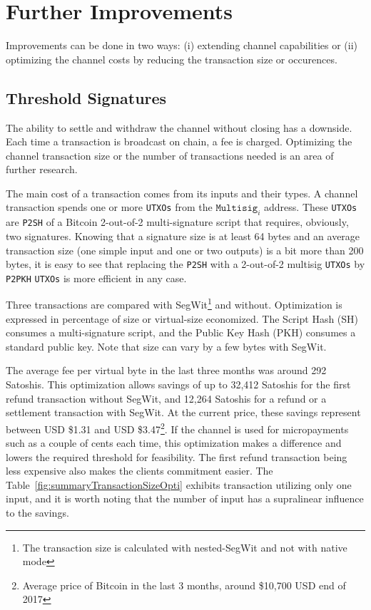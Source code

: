 \documentclass{llncs}
\begin{document}
\section{Further Improvements} Improvements can be done in two ways: (i)
extending channel capabilities or (ii) optimizing the channel costs by reducing
the transaction size or occurences.

\subsection{Threshold Signatures} The ability to settle and withdraw the channel
without closing has a downside. Each time a transaction is broadcast on chain, a
fee is charged. Optimizing the channel transaction size or the number of
transactions needed is an area of further research.

The main cost of a transaction comes from its inputs and their types. A channel
transaction spends one or more \texttt{UTXOs} from the $\texttt{Multisig}_{i}$
address. These \texttt{UTXOs} are \texttt{P2SH} of a Bitcoin 2-out-of-2
multi-signature script that requires, obviously, two signatures. Knowing that a
signature size is at least 64 bytes and an average transaction size (one simple
input and one or two outputs) is a bit more than 200 bytes, it is easy to see
that replacing the \texttt{P2SH} with a 2-out-of-2 multisig \texttt{UTXOs} by
\texttt{P2PKH} \texttt{UTXOs} is more efficient in any case.

Three transactions are compared with SegWit\footnote{ The transaction size
is calculated with nested-SegWit and not with native mode} and without.
Optimization is expressed in percentage of size or virtual-size economized. The
Script Hash (SH) consumes a multi-signature script, and the Public Key Hash
(PKH) consumes a standard public key. Note that size can vary by a few bytes
with SegWit.

The average fee per virtual byte in the last three months was around 292
Satoshis. This optimization allows savings of up to 32,412 Satoshis for the
first refund transaction without SegWit, and 12,264 Satoshis for a refund
or a settlement transaction with SegWit. At the current price, these
savings represent between USD \$1.31 and USD \$3.47\footnote{ Average price of
Bitcoin in the last 3 months, around \$10,700 USD end of 2017}. If the channel is used for
micropayments such as a couple of cents each time, this optimization makes a
difference and lowers the required threshold for feasibility. The first refund
transaction being less expensive also makes the clients commitment easier. The
Table~\ref{fig:summaryTransactionSizeOpti} exhibits transaction utilizing only
one input, and it is worth noting that the number of input has a supralinear
influence to the savings.
\end{document}
